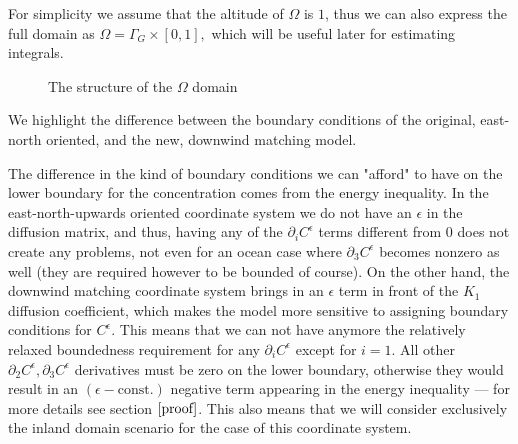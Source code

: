 \documentclass[11pt]{article}
\begin{document}
    For simplicity we assume that the altitude of $\Omega$ is $1$, thus we can also express the full domain as $\Omega =  \Gamma_G \times [0,1],$ which will be useful later for estimating integrals.
    
  \begin{figure}[!h]
  \centering
  \caption{The structure of the $\Omega$ domain}
  \label{structdomaingraph1}
\end{figure}
    
We highlight the difference between the boundary conditions of the original, east-north oriented, and the new, downwind matching model.

The difference in the kind of boundary conditions we can "afford" to have on the lower boundary for the concentration comes from the energy inequality. In the east-north-upwards oriented coordinate system we do not have an $\epsilon$ in the diffusion matrix, and thus, having any of the $\partial_i C^\epsilon$ terms different from 0 does not create any problems, not even for an ocean case where $\partial_3 C^\epsilon$ becomes nonzero as well (they are required however to be bounded of course). On the other hand, the downwind matching coordinate system brings in an $\epsilon$ term in front of the $K_1$ diffusion coefficient, which makes the model more sensitive to assigning boundary conditions for $C^\epsilon.$ This means that we can not have anymore the relatively relaxed boundedness requirement for any $\partial_i C^\epsilon$ except for $i=1.$ All other $\partial_2 C^\epsilon, \partial_3 C^\epsilon$ derivatives must be zero on the lower boundary, otherwise they would result in an $(\epsilon - \text{const.})$ negative term appearing in the energy inequality --- for more details see section $\ref{proof}$. This also means that we will consider exclusively the inland domain scenario for the case of this coordinate system.
\end{document}
